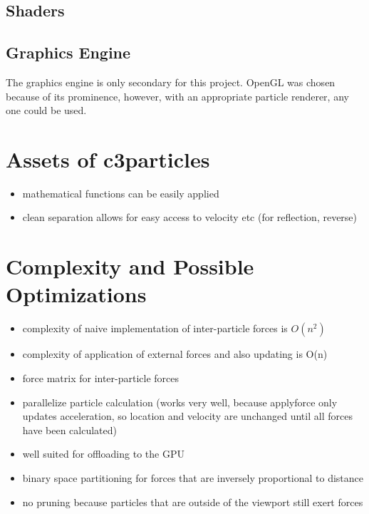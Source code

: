 \documentclass[runningheads,a4paper]{llncs}
\begin{document}
\subsection{Shaders}

\subsection{Graphics Engine}
The graphics engine is only secondary for this project. OpenGL\cite{opengl} was chosen because of its prominence, however, with an appropriate particle renderer, any one could be used.

\section{Assets of c3particles}
\begin{itemize}
\item mathematical functions can be easily applied
\item clean separation allows for easy access to velocity etc (for reflection, reverse)
\end{itemize}

\section{Complexity and Possible Optimizations}
\begin{itemize}
\item complexity of naive implementation of inter-particle forces is $O(n^2)$
\item complexity of application of external forces and also updating is O(n)
\item force matrix for inter-particle forces
\item parallelize particle calculation (works very well, because applyforce only updates acceleration, so location and velocity are unchanged until all forces have been calculated)
\item well suited for offloading to the GPU
\item binary space partitioning for forces that are inversely proportional to distance
\item no pruning because particles that are outside of the viewport still exert forces 
\end{itemize}




\end{document}
